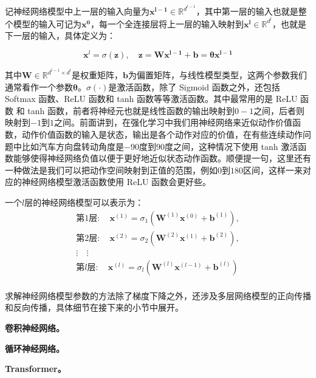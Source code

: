 记神经网络模型中上一层的输入向量为$\boldsymbol{x^{l-1}}\in \mathbb{R}^{d^{l-1}}$，其中第一层的输入也就是整个模型的输入可记为$\boldsymbol{x^0}$，每一个全连接层将上一层的输入映射到$\boldsymbol{x^{l}}\in \mathbb{R}^{d^{l}}$，也就是下一层的输入，具体定义为：

\begin{equation}
    \boldsymbol{x}^{l}=\sigma(\boldsymbol{z}), \quad \boldsymbol{z}=\boldsymbol{W} \boldsymbol{x^{l-1}}+\boldsymbol{b} = \boldsymbol{\theta} \boldsymbol{x^{l-1}}
\end{equation}

其中$\boldsymbol{W}\in \mathbb{R}^{d^{l-1} \times d^{l}}$是权重矩阵，$\boldsymbol{b}$为偏置矩阵，与线性模型类型，这两个参数我们通常看作一个参数$\boldsymbol{\theta}$。$\sigma(\cdot)$是激活函数，除了 Sigmoid 函数之外，还包括 Softmax 函数、ReLU 函数和 tanh 函数等等激活函数。其中最常用的是 ReLU 函数 和 tanh 函数，前者将神经元也就是线性函数的输出映射到$0-1$之间，后者则映射到$-1$到$1$之间。前面讲到，在强化学习中我们用神经网络来近似动作价值函数，动作价值函数的输入是状态，输出是各个动作对应的价值，在有些连续动作问题中比如汽车方向盘转动角度是$-90$度到$90$度之间，这种情况下使用 tanh 激活函数能够使得神经网络负值以便于更好地近似状态动作函数。顺便提一句，这里还有一种做法是我们可以把动作空间映射到正值的范围，例如$0$到$180$区间，这样一来对应的神经网络模型激活函数使用 ReLU 函数会更好些。

一个$l$层的神经网络模型可以表示为：
\begin{equation}
    \begin{split}
    第 1 层: \quad \boldsymbol{x}^{(1)}=\sigma_1\left(\boldsymbol{W}^{(1)} \boldsymbol{x}^{(0)}+\boldsymbol{b}^{(1)}\right),\\
    第 2 层: \quad \boldsymbol{x}^{(2)}=\sigma_2\left(\boldsymbol{W}^{(2)} \boldsymbol{x}^{(1)}+\boldsymbol{b}^{(2)}\right),\\
    \vdots \quad \vdots\\
    第 l 层: \quad \boldsymbol{x}^{(l)}=\sigma_l\left(\boldsymbol{W}^{(l)} \boldsymbol{x}^{(l-1)}+\boldsymbol{b}^{(l)}\right)\\
\end{split}
\end{equation}

求解神经网络模型参数的方法除了梯度下降之外，还涉及多层网络模型的正向传播和反向传播，具体细节在接下来的小节中展开。

{\bfseries 卷积神经网络。}

{\bfseries 循环神经网络。}


{\bfseries Transformer。}
